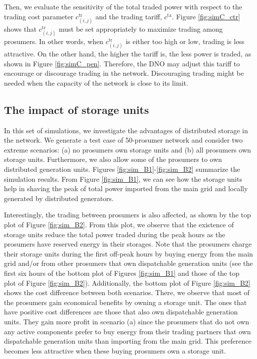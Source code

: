 \documentclass{IEEEtran}  %
\newcommand{\0}{\mathbf{0}}
\newcommand{\1}{\mathbf{1}}
\begin{document}
%
Then, we evaluate the sensitivity of the total traded power with respect to the trading cost parameter $c_{(i,j)}^{\mathrm{tr}}$ and the trading tariff, $c^{\mathrm{ta}}$. Figure \ref{fig:simC_ctr} shows that   $c_{(i,j)}^{\mathrm{tr}}$ must be set appropriately to maximize trading among prosumers. In other words, when $c_{(i,j)}^{\mathrm{tr}}$ is either too high or low, trading is less attractive. 
On the other hand, the higher the tariff is, the less power is traded, as shown in Figure \ref{fig:simC_pen}. Therefore, the DNO may adjust this tariff to encourage or discourage trading in the network. Discouraging trading might be needed when the capacity of the network is close to its limit. 



\subsection{The impact of storage units}
In this set of simulations, we investigate the advantages of distributed storage in the network. We generate a test case of 50-prosumer network and consider two extreme scenarios: (a) no prosumers own storage units and  (b) all prosumers own storage units. Furthermore, we also allow some of the prosumers to own distributed generation units. Figures \ref{fig:sim_B1}-\ref{fig:sim_B2} summarize the simulation results. From Figure \ref{fig:sim_B1}, we can see how the storage units help in shaving the peak of total power imported from the main grid and locally generated by distributed generators. 

Interestingly, the trading between prosumers is also affected, as shown by the top plot of Figure \ref{fig:sim_B2}. From this plot, we observe that the existence of storage units reduce the total power traded during the peak hours as the prosumers have reserved energy in their storages.
%
Note that the prosumers charge their storage units during the first off-peak hours by buying energy from the main grid and/or from other prosumers that own dispatchable generation units (see the first six hours of the bottom plot of Figures \ref{fig:sim_B1} and those of the top plot of Figure \ref{fig:sim_B2}). 
%
Additionally, the bottom plot of Figure \ref{fig:sim_B2} shows the cost difference between both scenarios. There, we observe that most of the prosumers gain economical benefits by owning a storage unit. The ones that have positive cost differences are those that also own dispatchable generation units.
They gain more profit in scenario (a) since the prosumers that do not own any active components prefer to buy energy from their trading partners that own dispatchable generation units than importing from the main grid. This preference becomes less attractive when these buying prosumers own a storage unit.
%
\end{document}
